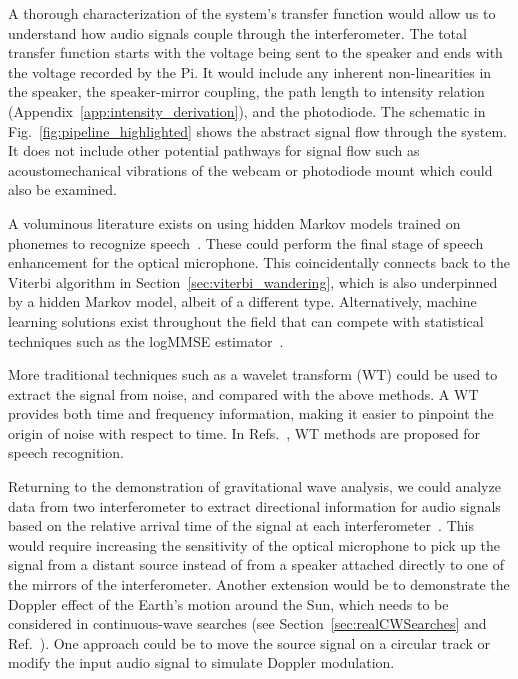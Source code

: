 \documentclass[paper-main.tex]{subfiles}
\begin{document}
A thorough characterization of the system's transfer function would allow us to understand how audio signals couple through the interferometer. 
The total transfer function starts with the voltage being sent to the speaker and ends with the voltage recorded by the Pi. 
It would include any inherent non-linearities in the speaker, the speaker-mirror coupling, the path length to intensity relation (Appendix~\ref{app:intensity_derivation}), and the photodiode. 
The schematic in Fig.~\ref{fig:pipeline_highlighted} shows the abstract signal flow through the system.
It does not include other potential pathways for signal flow such as acoustomechanical vibrations of the webcam or photodiode mount which could also be examined.


A voluminous literature exists on using hidden Markov models trained on phonemes to recognize speech~\cite{HMM_english}. 
These could perform the final stage of speech enhancement for the optical microphone. 
This coincidentally connects back to the Viterbi algorithm in Section~\ref{sec:viterbi_wandering}, which is also underpinned by a hidden Markov model, albeit of a different type. Alternatively, machine learning solutions exist throughout the field that can compete with statistical techniques such as the logMMSE estimator~\cite{SEGAN}.


More traditional techniques such as a wavelet transform (WT) \citep{nason1995stationary} could be used to extract the signal from noise, and compared with the above methods. 
A WT provides both time and frequency information, making it easier to pinpoint the origin of noise with respect to time. 
In Refs.~\cite{tufekci2000feature,agbinya1996discrete}, WT methods are proposed for speech recognition. 


Returning to the demonstration of gravitational wave analysis, we could analyze data from two interferometer to extract directional information for audio signals based on the relative arrival time of the signal at each interferometer~\cite{GW150914}.
This would require increasing the sensitivity of the optical microphone to pick up the signal from a distant source instead of from a speaker attached directly to one of the mirrors of the interferometer.
Another extension would be to demonstrate the Doppler effect of the Earth's motion around the Sun, which needs to be considered in continuous-wave searches (see Section~\ref{sec:realCWSearches} and Ref.~\cite{JKS:1998}). 
One approach could be to move the source signal on a circular track or modify the input audio signal to simulate Doppler modulation. 
\end{document}
